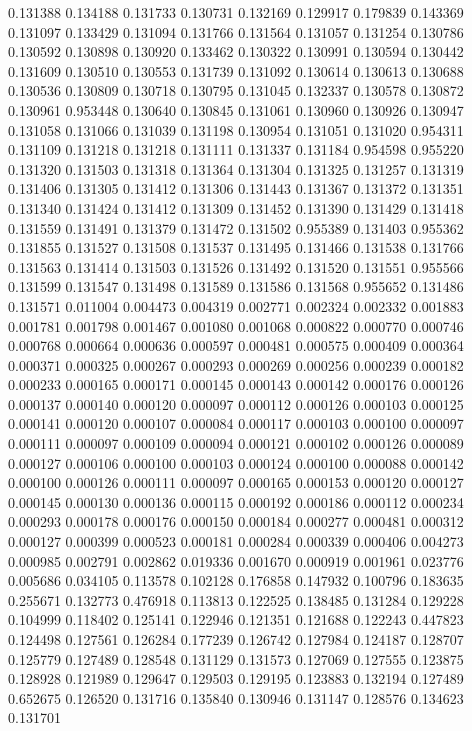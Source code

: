 0.131388
0.134188
0.131733
0.130731
0.132169
0.129917
0.179839
0.143369
0.131097
0.133429
0.131094
0.131766
0.131564
0.131057
0.131254
0.130786
0.130592
0.130898
0.130920
0.133462
0.130322
0.130991
0.130594
0.130442
0.131609
0.130510
0.130553
0.131739
0.131092
0.130614
0.130613
0.130688
0.130536
0.130809
0.130718
0.130795
0.131045
0.132337
0.130578
0.130872
0.130961
0.953448
0.130640
0.130845
0.131061
0.130960
0.130926
0.130947
0.131058
0.131066
0.131039
0.131198
0.130954
0.131051
0.131020
0.954311
0.131109
0.131218
0.131218
0.131111
0.131337
0.131184
0.954598
0.955220
0.131320
0.131503
0.131318
0.131364
0.131304
0.131325
0.131257
0.131319
0.131406
0.131305
0.131412
0.131306
0.131443
0.131367
0.131372
0.131351
0.131340
0.131424
0.131412
0.131309
0.131452
0.131390
0.131429
0.131418
0.131559
0.131491
0.131379
0.131472
0.131502
0.955389
0.131403
0.955362
0.131855
0.131527
0.131508
0.131537
0.131495
0.131466
0.131538
0.131766
0.131563
0.131414
0.131503
0.131526
0.131492
0.131520
0.131551
0.955566
0.131599
0.131547
0.131498
0.131589
0.131586
0.131568
0.955652
0.131486
0.131571
0.011004
0.004473
0.004319
0.002771
0.002324
0.002332
0.001883
0.001781
0.001798
0.001467
0.001080
0.001068
0.000822
0.000770
0.000746
0.000768
0.000664
0.000636
0.000597
0.000481
0.000575
0.000409
0.000364
0.000371
0.000325
0.000267
0.000293
0.000269
0.000256
0.000239
0.000182
0.000233
0.000165
0.000171
0.000145
0.000143
0.000142
0.000176
0.000126
0.000137
0.000140
0.000120
0.000097
0.000112
0.000126
0.000103
0.000125
0.000141
0.000120
0.000107
0.000084
0.000117
0.000103
0.000100
0.000097
0.000111
0.000097
0.000109
0.000094
0.000121
0.000102
0.000126
0.000089
0.000127
0.000106
0.000100
0.000103
0.000124
0.000100
0.000088
0.000142
0.000100
0.000126
0.000111
0.000097
0.000165
0.000153
0.000120
0.000127
0.000145
0.000130
0.000136
0.000115
0.000192
0.000186
0.000112
0.000234
0.000293
0.000178
0.000176
0.000150
0.000184
0.000277
0.000481
0.000312
0.000127
0.000399
0.000523
0.000181
0.000284
0.000339
0.000406
0.004273
0.000985
0.002791
0.002862
0.019336
0.001670
0.000919
0.001961
0.023776
0.005686
0.034105
0.113578
0.102128
0.176858
0.147932
0.100796
0.183635
0.255671
0.132773
0.476918
0.113813
0.122525
0.138485
0.131284
0.129228
0.104999
0.118402
0.125141
0.122946
0.121351
0.121688
0.122243
0.447823
0.124498
0.127561
0.126284
0.177239
0.126742
0.127984
0.124187
0.128707
0.125779
0.127489
0.128548
0.131129
0.131573
0.127069
0.127555
0.123875
0.128928
0.121989
0.129647
0.129503
0.129195
0.123883
0.132194
0.127489
0.652675
0.126520
0.131716
0.135840
0.130946
0.131147
0.128576
0.134623
0.131701
